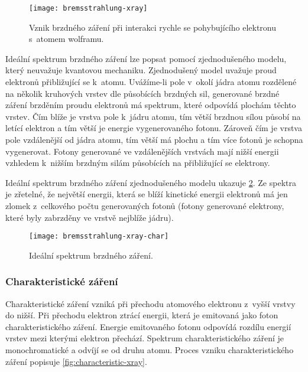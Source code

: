 \begin{figure}[bh]
\centering
\texttt{[image: bremsstrahlung-xray]}
\caption{Vznik brzdného záření při interakci rychle se pohybujícího elektronu s~atomem wolframu. \cite{the-xray-beam}}
\label{fig:bremsstrahlung-xray}
\end{figure}

Ideální spektrum brzdného záření lze popsat pomocí zjednodušeného modelu, který neuvažuje kvantovou mechaniku. Zjednodušený model uvažuje proud elektronů přibližující se k~atomu. Uvážíme-li pole v~okolí jádra atomu rozdělené na několik kruhových vrstev dle působících brzdných sil, generované brzdné záření brzděním proudu elektronů má spektrum, které odpovídá plochám těchto vrstev. Čím blíže je vrstva pole k~jádru atomu, tím větší brzdnou sílou působí na letící elektron a tím větší je energie vygenerovaného fotonu. Zároveň čím je vrstva pole vzdálenější od jádra atomu, tím větší má plochu a tím více fotonů je schopna vygenerovat. Fotony generované ve vzdálenějších vrstvách mají nižší energii vzhledem k~nižším brzdným silám působících na přibližující se elektrony. \cite[kap.~THE~X-RAY TUBE]{The-Physical-Principles-of-Medical-Imaging}

Ideální spektrum brzdného záření zjednodušeného modelu ukazuje \cref{fig:bremsstrahlung-xray-char}. Ze spektra je zřetelné, že největší energii, která se blíží kinetické energii elektronů má jen zlomek z~celkového počtu generovaných fotonů (fotony generované elektrony, které byly zabrzděny ve vrstvě nejblíže jádru).

\begin{figure}[bh]
\centering
\texttt{[image: bremsstrahlung-xray-char]}
\caption{Ideální spektrum brzdného záření. \cite[str.~90]{Diagnostic-Radiology-Physics}}
\label{fig:bremsstrahlung-xray-char}
\end{figure}

\subsubsection{Charakteristické záření}
Charakteristické záření vzniká při přechodu atomového elektronu z~vyšší vrstvy do nižší. Při přechodu elektron ztrácí energii, která je emitovaná jako foton charakteristického záření. Energie emitovaného fotonu odpovídá rozdílu energií vrstev mezi kterými elektron přechází. Spektrum charakteristického záření je monochromatické a odvíjí se od druhu atomu. Proces vzniku charakteristického záření popisuje \cref{fig:characteristic-xray}. \cite[str.~91]{Diagnostic-Radiology-Physics}

